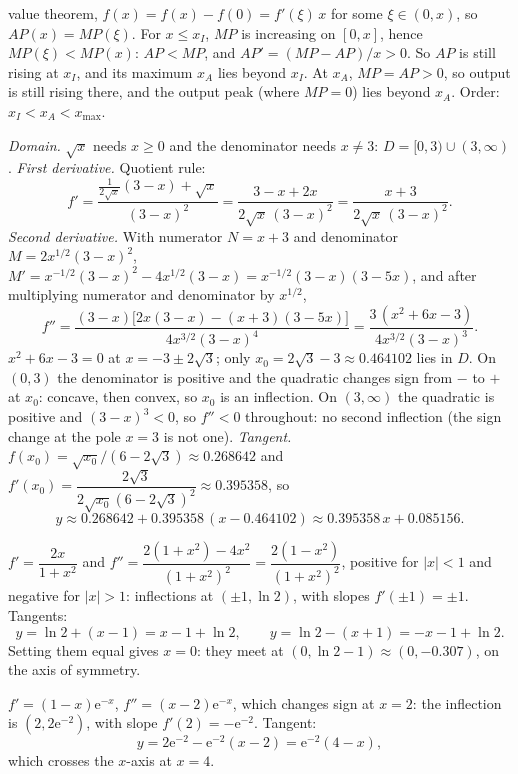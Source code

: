 \begin{solutions}
        value theorem, $f(x)=f(x)-f(0)=f'(\xi)\,x$ for some $\xi\in(0,x)$,
        so $AP(x)=MP(\xi)$. For $x\le x_{I}$, $MP$ is increasing on
        $[0,x]$, hence $MP(\xi)<MP(x)$: $AP<MP$, and
        $AP'=(MP-AP)/x>0$. So $AP$ is still rising at $x_{I}$, and its
        maximum $x_{A}$ lies beyond $x_{I}$. At $x_{A}$, $MP=AP>0$, so
        output is still rising there, and the output peak (where $MP=0$)
        lies beyond $x_{A}$. Order: $x_{I}<x_{A}<x_{\max}$.
  \item \emph{Domain.} $\sqrt{x}$ needs $x\ge0$ and the denominator needs
        $x\neq3$: $D=[0,3)\cup(3,\infty)$.
        \emph{First derivative.} Quotient rule:
        \[
          f'=\frac{\frac{1}{2\sqrt x}(3-x)+\sqrt x}{(3-x)^{2}}
            =\frac{3-x+2x}{2\sqrt x\,(3-x)^{2}}
            =\frac{x+3}{2\sqrt x\,(3-x)^{2}} .
        \]
        \emph{Second derivative.} With numerator $N=x+3$ and denominator
        $M=2x^{1/2}(3-x)^{2}$,
        $M'=x^{-1/2}(3-x)^{2}-4x^{1/2}(3-x)=x^{-1/2}(3-x)(3-5x)$, and
        after multiplying numerator and denominator by $x^{1/2}$,
        \[
          f''=\frac{(3-x)\bigl[2x(3-x)-(x+3)(3-5x)\bigr]}
                   {4x^{3/2}(3-x)^{4}}
             =\frac{3\,(x^{2}+6x-3)}{4x^{3/2}(3-x)^{3}} .
        \]
        $x^{2}+6x-3=0$ at $x=-3\pm2\sqrt3$; only $x_{0}=2\sqrt3-3\approx
        0.464102$ lies in $D$. On $(0,3)$ the denominator is positive and
        the quadratic changes sign from $-$ to $+$ at $x_{0}$: concave,
        then convex, so $x_{0}$ is an inflection. On $(3,\infty)$ the
        quadratic is positive and $(3-x)^{3}<0$, so $f''<0$ throughout: no
        second inflection (the sign change at the pole $x=3$ is not one).
        \emph{Tangent.} $f(x_{0})=\sqrt{x_{0}}/(6-2\sqrt3)\approx0.268642$
        and $f'(x_{0})=\dfrac{2\sqrt3}{2\sqrt{x_{0}}(6-2\sqrt3)^{2}}
        \approx0.395358$, so
        \[
          y\approx0.268642+0.395358\,(x-0.464102)
           \approx0.395358\,x+0.085156 .
        \]
  \item $f'=\dfrac{2x}{1+x^{2}}$ and
        $f''=\dfrac{2(1+x^{2})-4x^{2}}{(1+x^{2})^{2}}
        =\dfrac{2(1-x^{2})}{(1+x^{2})^{2}}$, positive for $|x|<1$ and
        negative for $|x|>1$: inflections at $(\pm1,\ln2)$, with slopes
        $f'(\pm1)=\pm1$. Tangents:
        \[
          y=\ln2+(x-1)=x-1+\ln2,\qquad y=\ln2-(x+1)=-x-1+\ln2 .
        \]
        Setting them equal gives $x=0$: they meet at
        $(0,\ln2-1)\approx(0,-0.307)$, on the axis of symmetry.
  \item $f'=(1-x)\mathrm{e}^{-x}$, $f''=(x-2)\mathrm{e}^{-x}$, which
        changes sign at $x=2$: the inflection is $(2,2\mathrm{e}^{-2})$,
        with slope $f'(2)=-\mathrm{e}^{-2}$. Tangent:
        \[
          y=2\mathrm{e}^{-2}-\mathrm{e}^{-2}(x-2)=\mathrm{e}^{-2}(4-x),
        \]
        which crosses the $x$-axis at $x=4$.
\end{solutions}
